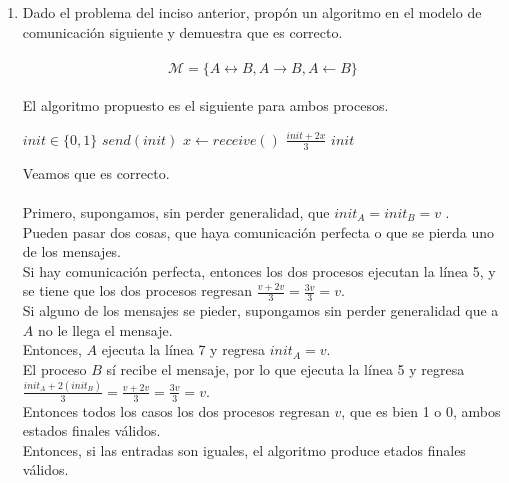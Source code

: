 \documentclass[12pt,a4paper]{report}
\begin{document}
\begin{enumerate}
{
	}

		\item {
		Dado el problema del inciso anterior, propón un algoritmo en el modelo de
		comunicación siguiente y demuestra que es correcto.\\\\
			\begin{equation*}
				\mathcal{M} = \{A \leftrightarrow B, A \rightarrow B, A \leftarrow B \}
			\end{equation*}\\
		El algoritmo propuesto es el siguiente para ambos procesos.\\
			\begin{algorithmic}[1]
				\Require $init \in \{0, 1\}$
					\State $send(init)$
					\State $x \gets receive()$
						\State \Return $\frac{init + 2x}{3}$
					\Else
						\State \Return $init$
					\EndIf
				\EndFunction
			\end{algorithmic}
		Veamos que es correcto.\\\\

		Primero, supongamos, sin perder generalidad, que $init_A = init_B = v$ .\\
		Pueden pasar dos cosas, que haya comunicación perfecta o que se pierda uno
		de los mensajes.\\
		Si hay comunicación perfecta, entonces los dos procesos ejecutan la línea 5,
		y se tiene que los dos procesos regresan $\frac{v + 2v}{3} = \frac{3v}{3} = v$.\\
		Si alguno de los mensajes se pieder, supongamos sin perder generalidad que a $A$
		no le llega el mensaje.\\
		Entonces, $A$ ejecuta la línea 7 y regresa $init_A = v$.\\
		El proceso $B$ sí recibe el mensaje, por lo que ejecuta la línea 5 y regresa
		$\frac{init_A + 2 (init_B)}{3} = \frac{v + 2v}{3} = \frac{3v}{3} = v$.\\
		Entonces todos los casos los dos procesos regresan $v$, que es bien 1 o 0,
		ambos estados finales válidos.\\
		Entonces, si las entradas son iguales, el algoritmo produce etados finales válidos.\\\\

}
\end{enumerate}
\end{document}
